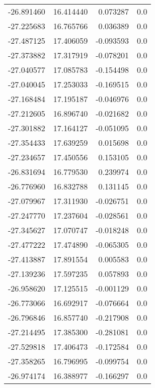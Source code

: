 \begin{tabular}{rrrr}
      -26.891460 &        16.414440 &    0.073287 &   0.0 \\
      -27.225683 &        16.765766 &    0.036389 &   0.0 \\
      -27.487125 &        17.406059 &   -0.093593 &   0.0 \\
      -27.373882 &        17.317919 &   -0.078201 &   0.0 \\
      -27.040577 &        17.085783 &   -0.154498 &   0.0 \\
      -27.040045 &        17.253033 &   -0.169515 &   0.0 \\
      -27.168484 &        17.195187 &   -0.046976 &   0.0 \\
      -27.212605 &        16.896740 &   -0.021682 &   0.0 \\
      -27.301882 &        17.164127 &   -0.051095 &   0.0 \\
      -27.354433 &        17.639259 &    0.015698 &   0.0 \\
      -27.234657 &        17.450556 &    0.153105 &   0.0 \\
      -26.831694 &        16.779530 &    0.239974 &   0.0 \\
      -26.776960 &        16.832788 &    0.131145 &   0.0 \\
      -27.079967 &        17.311930 &   -0.026751 &   0.0 \\
      -27.247770 &        17.237604 &   -0.028561 &   0.0 \\
      -27.345627 &        17.070747 &   -0.018248 &   0.0 \\
      -27.477222 &        17.474890 &   -0.065305 &   0.0 \\
      -27.413887 &        17.891554 &    0.005583 &   0.0 \\
      -27.139236 &        17.597235 &    0.057893 &   0.0 \\
      -26.958620 &        17.125515 &   -0.001129 &   0.0 \\
      -26.773066 &        16.692917 &   -0.076664 &   0.0 \\
      -26.796846 &        16.857740 &   -0.217908 &   0.0 \\
      -27.214495 &        17.385300 &   -0.281081 &   0.0 \\
      -27.529818 &        17.406473 &   -0.172584 &   0.0 \\
      -27.358265 &        16.796995 &   -0.099754 &   0.0 \\
      -26.974174 &        16.388977 &   -0.166297 &   0.0 \\

\end{tabular}
